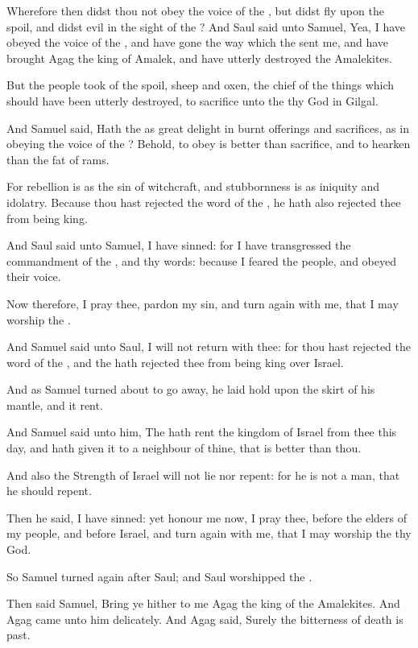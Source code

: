 \Verse Wherefore then didst thou not obey the voice of the \LORD, but didst fly upon the spoil, and didst evil in the sight of the \LORD?  \Verse And Saul said unto Samuel, Yea, I have obeyed the voice of the \LORD, and have gone the way which the \LORD sent me, and have brought Agag the king of Amalek, and have utterly destroyed the Amalekites.

\Verse But the people took of the spoil, sheep and oxen, the chief of the things which should have been utterly destroyed, to sacrifice unto the \LORD thy God in Gilgal.

\Verse And Samuel said, Hath the \LORD as great delight in burnt offerings and sacrifices, as in obeying the voice of the \LORD? Behold, to obey is better than sacrifice, and to hearken than the fat of rams.

\Verse For rebellion is as the sin of witchcraft, and stubbornness is as iniquity and idolatry. Because thou hast rejected the word of the \LORD, he hath also rejected thee from being king.

\Verse And Saul said unto Samuel, I have sinned: for I have transgressed the commandment of the \LORD, and thy words: because I feared the people, and obeyed their voice.

\Verse Now therefore, I pray thee, pardon my sin, and turn again with me, that I may worship the \LORD.

\Verse And Samuel said unto Saul, I will not return with thee: for thou hast rejected the word of the \LORD, and the \LORD hath rejected thee from being king over Israel.

\Verse And as Samuel turned about to go away, he laid hold upon the skirt of his mantle, and it rent.

\Verse And Samuel said unto him, The \LORD hath rent the kingdom of Israel from thee this day, and hath given it to a neighbour of thine, that is better than thou.

\Verse And also the Strength of Israel will not lie nor repent: for he is not a man, that he should repent.

\Verse Then he said, I have sinned: yet honour me now, I pray thee, before the elders of my people, and before Israel, and turn again with me, that I may worship the \LORD thy God.

\Verse So Samuel turned again after Saul; and Saul worshipped the \LORD.

\Verse Then said Samuel, Bring ye hither to me Agag the king of the Amalekites. And Agag came unto him delicately. And Agag said, Surely the bitterness of death is past.

